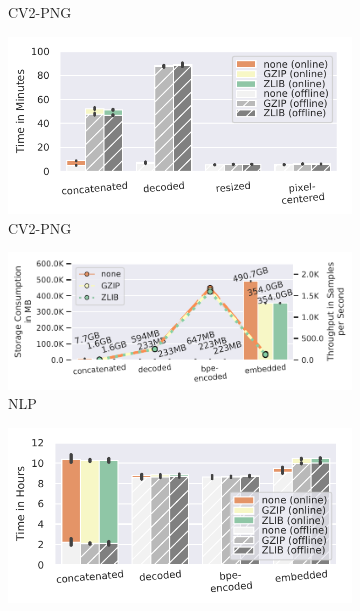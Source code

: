 {\begin{figure}
\begin{subfigure}[c]{0.26\textwidth}
        \vspace{-18pt}
        \caption{CV2-PNG}
        \label{fig:compressed-storage-vs-throughput-cv2-png}
    \end{subfigure}
    \begin{subfigure}[c]{0.21\textwidth}
        \includegraphics[width=\textwidth]{figures/cubeplusplus-png-pipeline/compression-processing-time-split.pdf}
        \vspace{-18pt}
        \caption{CV2-PNG}
        \label{fig:compressed-processing-time-cv2-png}
    \end{subfigure}
    \begin{subfigure}[c]{0.26\textwidth}
        \includegraphics[width=\textwidth]{figures/openwebtext-pipeline/compressed-storage-vs-throughput.pdf}
        \vspace{-18pt}
        \caption{NLP}
        \label{fig:compressed-storage-vs-throughput-nlp}
    \end{subfigure}
    \begin{subfigure}[c]{0.21\textwidth}
        \includegraphics[width=\textwidth]{figures/openwebtext-pipeline/compression-processing-time-split.pdf}

\end{subfigure}
\end{figure}}
